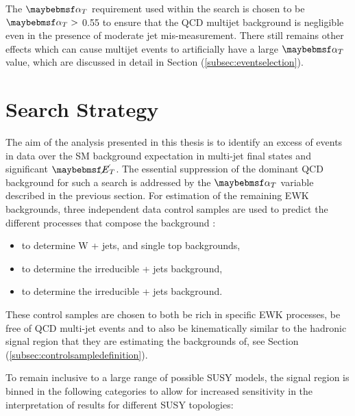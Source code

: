 The $\alphat$ requirement used within the search is chosen to be $\alphat >$ 0.55 to ensure that the QCD multijet background is negligible even in the presence of moderate jet mis-measurement. There still remains other effects which can cause multijet events to artificially have a large $\alphat$ value, which are discussed in detail in Section (\ref{subsec:eventselection}).  


\section{Search Strategy}
\label{subsec:searchstrategy}

The aim of the analysis presented in this thesis is to identify an excess of events in data over the \ac{SM} background expectation in multi-jet final states and significant $\met$. The essential suppression of the dominant QCD background for such a search is addressed by the $\alphat$ variable described in the previous section. For estimation of the remaining \ac{EWK} backgrounds, three independent data control samples are used to predict the different processes that compose the background :

\begin{itemize}
\item \mupjets to determine W + jets, \ttbar and single top backgrounds,
\item \gpjets  to determine the irreducible \zinv + jets background,
\item \dimupjets to determine the irreducible \zinv + jets background.
\end{itemize}

These control samples are chosen to both be rich in specific \ac{EWK} processes, be free of QCD multi-jet events and to also be kinematically similar to the hadronic signal region that they are estimating the backgrounds of, see Section (\ref{subsec:controlsampledefinition}).

To remain inclusive to a large range of possible \ac{SUSY} models, the signal region is binned in the following categories to allow for increased sensitivity in the interpretation of results for different \ac{SUSY} topologies:

